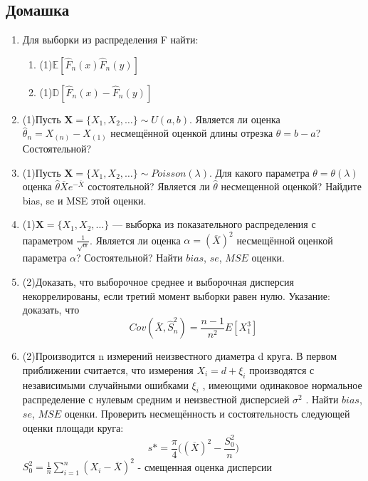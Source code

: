 \documentclass[a4paper, 14pt]{extarticle}
\begin{document}
\subsection*{Домашка}
\begin{enumerate}

\item Для выборки из распределения F  найти: 
\begin{enumerate}
\item (1)$\mathbb{E}[\hat F_n(x) \hat F_n(y)]$
\item (1)$\mathbb{D}[\hat F_n(x) - \hat F_n(y)]$ 
\end{enumerate}

\item (1)Пусть  $\textbf{X} = \{X_1, X_2, \dots\} \sim U(a, b)$. Является ли оценка $\hat\theta_n = X_{(n)} - X_{(1)}$
несмещённой оценкой длины отрезка $\theta = b - a$? Состоятельной?

\item (1)Пусть $\textbf{X} = \{X_1, X_2, \dots\} \sim Poisson(\lambda)$. Для какого параметра $\theta = \theta(\lambda)$ оценка $\hat \theta \overline{X}e^{-\overline{X}}$
состоятельной? Является ли $\hat \theta$ несмещенной оценкой? Найдите bias, se и MSE этой оценки.

\item (1)$\textbf{X} = \{X_1, X_2, \dots\}$ — выборка из показательного 
распределения с параметром $\frac{1}{\sqrt{\alpha}}$. 
Является ли оценка $\alpha = (\overline{X})^2$
несмещённой оценкой параметра $\alpha$? Состоятельной? Найти $bias$, $se$, $MSE$ оценки.

\item (2)Доказать, что выборочное среднее  и выборочная дисперсия  некоррелированы, если третий момент выборки равен
нулю. Указание: доказать, что $$Cov(\overline{X}, \hat S_n^2) = \frac{n-1}{n^2}
E[X_1^3]$$

\item (2)Производится n измерений неизвестного диаметра d круга. 
В первом приближении считается, что измерения $X_i = d + \xi_i$
производятся с независимыми случайными ошибками $\xi_i$ , имеющими одинаковое нормальное распределение с нулевым средним
и неизвестной дисперсией $\sigma^2$ .  Найти $bias$, $se$, $MSE$ оценки. 
Проверить несмещённость и состоятельность следующей оценки площади круга:
$$s* = \frac{\pi}{4}\Big((\overline{X})^2 - \frac{S_0^2}{n}\Big)$$
$S_0^2 = \frac{1}{n}\sum_{i=1}^{n}(X_i - \overline{X})^2$ - смещенная оценка дисперсии

\end{enumerate}
\end{document}
